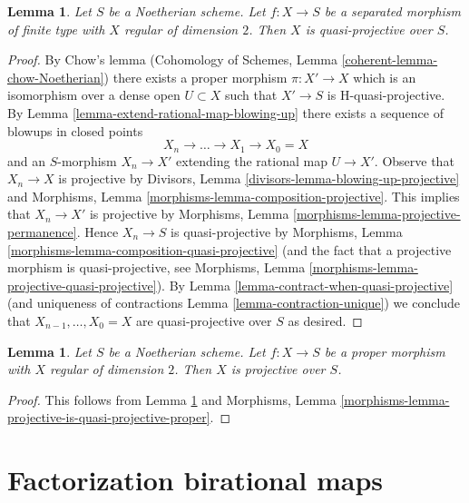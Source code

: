 \documentclass{stacks-project}
\theoremstyle{plain}
\newtheorem{lemma}[subsection]{Lemma}
\theoremstyle{definition}
\theoremstyle{remark}
\numberwithin{equation}{subsection}
\begin{document}
\begin{lemma}
\label{lemma-regular-dim-2-quasi-projective}
Let $S$ be a Noetherian scheme. Let $f : X \to S$ be a
separated morphism of finite type with $X$ regular of dimension $2$.
Then $X$ is quasi-projective over $S$.
\end{lemma}

\begin{proof}
By Chow's lemma
(Cohomology of Schemes, Lemma \ref{coherent-lemma-chow-Noetherian})
there exists a proper morphism $\pi : X' \to X$ which is an isomorphism
over a dense open $U \subset X$ such that $X' \to S$ is H-quasi-projective.
By Lemma \ref{lemma-extend-rational-map-blowing-up}
there exists a sequence of blowups in closed points
$$
X_n \to \ldots \to X_1 \to X_0 = X
$$
and an $S$-morphism $X_n \to X'$ extending the rational map $U \to X'$.
Observe that $X_n \to X$ is projective by
Divisors, Lemma \ref{divisors-lemma-blowing-up-projective} and
Morphisms, Lemma \ref{morphisms-lemma-composition-projective}.
This implies that $X_n \to X'$ is projective by
Morphisms, Lemma \ref{morphisms-lemma-projective-permanence}.
Hence $X_n \to S$ is quasi-projective by
Morphisms, Lemma \ref{morphisms-lemma-composition-quasi-projective}
(and the fact that a projective morphism is quasi-projective, see
Morphisms, Lemma \ref{morphisms-lemma-projective-quasi-projective}).
By Lemma \ref{lemma-contract-when-quasi-projective}
(and uniqueness of contractions Lemma \ref{lemma-contraction-unique})
we conclude  that $X_{n - 1}, \ldots, X_0 = X$ are quasi-projective over $S$
as desired.
\end{proof}

\begin{lemma}
\label{lemma-regular-dim-2-projective}
Let $S$ be a Noetherian scheme. Let $f : X \to S$ be a
proper morphism with $X$ regular of dimension $2$.
Then $X$ is projective over $S$.
\end{lemma}

\begin{proof}
This follows from
Lemma \ref{lemma-regular-dim-2-quasi-projective} and
Morphisms, Lemma \ref{morphisms-lemma-projective-is-quasi-projective-proper}.
\end{proof}






\section{Factorization birational maps}
\label{section-factorizing}
\end{document}
